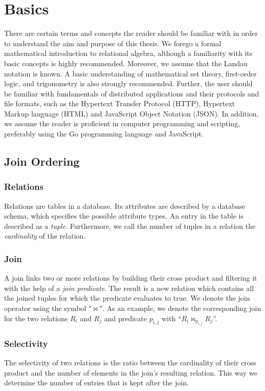\section{Basics}
\label{sec:basics}

There are certain terms and concepts the reader should be familiar with in order to understand the aim and purpose of this thesis. 
We forego a formal mathematical introduction to relational algebra, although a familiarity with its basic concepts is highly recommended. 
Moreover, we assume that the Landau notation is known. A basic understanding of mathematical set theory, first-order logic, and trigonometry is also strongly recommended. Further, the user should be familiar with fundamentals of distributed applications and their protocols and file formats, such as the Hypertext Transfer Protocol (HTTP), Hypertext Markup language (HTML) and JavaScript Object Notation (JSON). In addition, we assume the reader is proficient in computer programming and scripting, preferably using the Go programming language and JavaScript.

\subsection{Join Ordering}
\subsubsection{Relations}
Relations are tables in a database. 
Its attributes are described by a database schema, which specifies the possible attribute types.
An entry in the table is described as a \textit{tuple}. Furthermore, we call the number of tuples in a relation the \textit{cardinality} of the relation.

\subsubsection{Join}
A join links two or more relations by building their cross product and filtering it with the help of a \textit{join predicate}. 
The result is a new relation which contains all the joined tuples for which the predicate evaluates to true. We denote the join operator using the symbol "$\Join$". 
As an example, we denote the corresponding join for the two relations $R_i$ and $R_j$ and predicate ${p_{i,j}}$ with ``$R_i \Join_{p_{i,j}} R_j$''.

\subsubsection{Selectivity}
The selectivity of two relations is the ratio between the cardinality of their cross product and the number of elements in the join's resulting relation. 
This way we determine the number of entries that is kept after the join.

